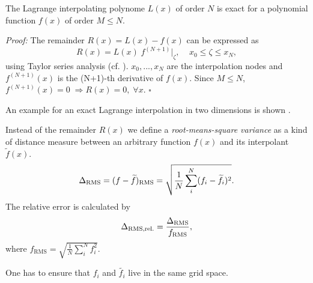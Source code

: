 The Lagrange interpolating polynome $L(x)$ of order $N$ is exact for a
polynomial function $f(x)$ of order $M \le N$.

\emph{Proof:} The remainder $R(x) = L(x) - f(x)$ can be expressed as
\begin{equation}
    R(x) = L(x) \; f^{(N+1)}|_{\zeta}, \;\;\;\; x_0 \le \zeta \le x_N,
\end{equation}
using Taylor series analysis (cf. \cite[p. 878]{abramowitz1964handbook}).
$x_0,...,x_N$ are the interpolation nodes and $f^{(N+1)}(x)$ is the (N+1)-th
derivative of $f(x)$.  Since $M \le N$, $f^{(N+1)}(x) = 0 \; \Rightarrow R(x) =
0,\; \forall x$. $\square$

An example for an exact Lagrange interpolation in two dimensions is shown
.

Instead of the remainder $R(x)$ we define a \emph{root-means-square
variance} as a kind of distance measure between an arbitrary function $f(x)$ and
its interpolant $\widetilde{f}(x)$.
\begin{equation}
\label{eqn:error-rms}
    \Delta_{\text{RMS}} = (f - \widetilde{f})_{\text{RMS}} = \sqrt{\frac{1}{N} \sum^N_i (f_i - \widetilde{f_i})^2}.
\end{equation}
The relative error is calculated by
\begin{equation}
    \Delta_{\text{RMS,rel.}} = \frac{\Delta_{\text{RMS}}}{f_{\text{RMS}}},
\end{equation}
where $f_{\text{RMS}} = \sqrt{\frac{1}{N} \sum^N_i f^2_i}$. 

\remark One has to ensure that $f_i$ and $\widetilde{f_i}$ live in the same grid space.

% 
% 

